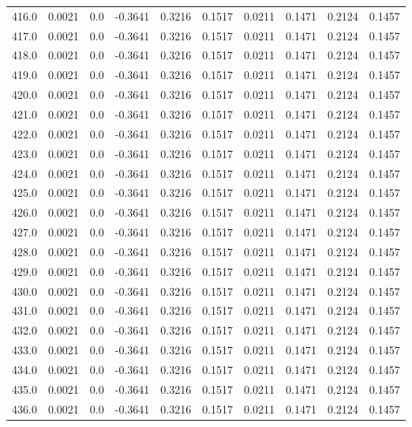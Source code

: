 \begin{longtable}{lrrrrrrrrr}
416.0 & 0.0021 & 0.0 & -0.3641 & 0.3216 & 0.1517 & 0.0211 & 0.1471 & 0.2124 & 0.1457 \\
417.0 & 0.0021 & 0.0 & -0.3641 & 0.3216 & 0.1517 & 0.0211 & 0.1471 & 0.2124 & 0.1457 \\
418.0 & 0.0021 & 0.0 & -0.3641 & 0.3216 & 0.1517 & 0.0211 & 0.1471 & 0.2124 & 0.1457 \\
419.0 & 0.0021 & 0.0 & -0.3641 & 0.3216 & 0.1517 & 0.0211 & 0.1471 & 0.2124 & 0.1457 \\
420.0 & 0.0021 & 0.0 & -0.3641 & 0.3216 & 0.1517 & 0.0211 & 0.1471 & 0.2124 & 0.1457 \\
421.0 & 0.0021 & 0.0 & -0.3641 & 0.3216 & 0.1517 & 0.0211 & 0.1471 & 0.2124 & 0.1457 \\
422.0 & 0.0021 & 0.0 & -0.3641 & 0.3216 & 0.1517 & 0.0211 & 0.1471 & 0.2124 & 0.1457 \\
423.0 & 0.0021 & 0.0 & -0.3641 & 0.3216 & 0.1517 & 0.0211 & 0.1471 & 0.2124 & 0.1457 \\
424.0 & 0.0021 & 0.0 & -0.3641 & 0.3216 & 0.1517 & 0.0211 & 0.1471 & 0.2124 & 0.1457 \\
425.0 & 0.0021 & 0.0 & -0.3641 & 0.3216 & 0.1517 & 0.0211 & 0.1471 & 0.2124 & 0.1457 \\
426.0 & 0.0021 & 0.0 & -0.3641 & 0.3216 & 0.1517 & 0.0211 & 0.1471 & 0.2124 & 0.1457 \\
427.0 & 0.0021 & 0.0 & -0.3641 & 0.3216 & 0.1517 & 0.0211 & 0.1471 & 0.2124 & 0.1457 \\
428.0 & 0.0021 & 0.0 & -0.3641 & 0.3216 & 0.1517 & 0.0211 & 0.1471 & 0.2124 & 0.1457 \\
429.0 & 0.0021 & 0.0 & -0.3641 & 0.3216 & 0.1517 & 0.0211 & 0.1471 & 0.2124 & 0.1457 \\
430.0 & 0.0021 & 0.0 & -0.3641 & 0.3216 & 0.1517 & 0.0211 & 0.1471 & 0.2124 & 0.1457 \\
431.0 & 0.0021 & 0.0 & -0.3641 & 0.3216 & 0.1517 & 0.0211 & 0.1471 & 0.2124 & 0.1457 \\
432.0 & 0.0021 & 0.0 & -0.3641 & 0.3216 & 0.1517 & 0.0211 & 0.1471 & 0.2124 & 0.1457 \\
433.0 & 0.0021 & 0.0 & -0.3641 & 0.3216 & 0.1517 & 0.0211 & 0.1471 & 0.2124 & 0.1457 \\
434.0 & 0.0021 & 0.0 & -0.3641 & 0.3216 & 0.1517 & 0.0211 & 0.1471 & 0.2124 & 0.1457 \\
435.0 & 0.0021 & 0.0 & -0.3641 & 0.3216 & 0.1517 & 0.0211 & 0.1471 & 0.2124 & 0.1457 \\
436.0 & 0.0021 & 0.0 & -0.3641 & 0.3216 & 0.1517 & 0.0211 & 0.1471 & 0.2124 & 0.1457 \\

\end{longtable}
